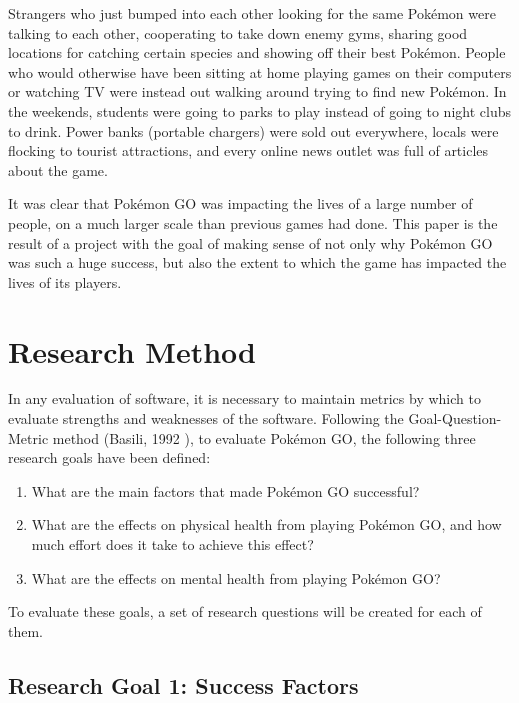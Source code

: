 Strangers who just bumped into each other looking for the same Pokémon were talking to each other, cooperating to take down enemy gyms, sharing good locations for catching certain species and showing off their best Pokémon. People who would otherwise have been sitting at home playing games on their computers or watching TV were instead out walking around trying to find new Pokémon. In the weekends, students were going to parks to play instead of going to night clubs to drink.  Power banks (portable chargers) were sold out everywhere, locals were flocking to tourist attractions, and every online news outlet was full of articles about the game.

It was clear that Pokémon GO was impacting the lives of a large number of people, on a much larger scale than previous games had done. This paper is the result of a project with the goal of making sense of not only why Pokémon GO was such a huge success, but also the extent to which the game has impacted the lives of its players.


\chapter{Research Method}
\label{chapter:research-questions}

In any evaluation of software, it is necessary to maintain metrics by which to evaluate strengths and weaknesses of the software. Following the Goal-Question-Metric method (Basili, 1992 \cite{basili1992gqm}), to evaluate Pokémon GO, the following three research goals have been defined:

\begin{enumerate}[label=RG{\arabic*}]
	\item What are the main factors that made Pokémon GO successful?
	\item What are the effects on physical health from playing Pokémon GO, and how much effort does it take to achieve this effect?
	\item What are the effects on mental health from playing Pokémon GO?
\end{enumerate}

To evaluate these goals, a set of research questions will be created for each of them.

\section{Research Goal 1: Success Factors}
\label{rg1}

